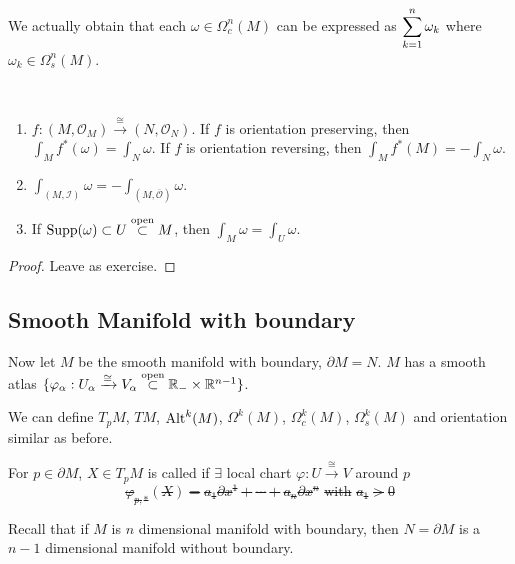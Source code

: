 \begin{remark}
    We actually obtain that each  $ \omega\in \Omega_c^n(M) $ can be expressed as  $ \displaystyle\sum_{k=1}^n\omega_k $ where  $ \omega_k\in\Omega_s^n(M) $.   
\end{remark}
\begin{proposition}
    \,
    \begin{enumerate}
        \item  $ f:(M,\mathcal{O}_M)\xrightarrow{\cong}(N,\mathcal{O}_N) $. If  $ f $ is orientation preserving, then  $ \int_Mf^*(\omega)=\int_N\omega $. If  $ f $ is orientation reversing, then  $ \int_Mf^*(M)=-\int_N\omega $. 
        \item  $ \int_{(M,\mathcal{I})}\omega=-\int_{(M,\overline{\mathcal{O}})}\omega $.
        \item If  $ \mathrm{Supp}(\omega)\subset U\overset{\text{open}}{\subset} M $, then  $ \int_M\omega=\int_U\omega $.       
    \end{enumerate}
\end{proposition}
\begin{proof}
    Leave as exercise.
\end{proof}

\subsection{Smooth Manifold with boundary}
Now let  $ M $ be the smooth manifold with boundary,  $ \partial M=N $. \ie  $ M $ has a smooth atlas  $ \{\varphi_\alpha:U_\alpha\xrightarrow{\cong}V_\alpha\overset{\text{open}}{\subset}\mathbb R_{-}\times\mathbb R^{n-1}\} $.

We can define  $ T_pM $,  $ TM $, $ \mathrm{Alt}^k(M) $, $ \Omega^k(M) $,  $ \Omega_c^k(M) $,  $ \Omega_s^k(M) $ and orientation similar as before.

For  $ p\in\partial M $,  $ X\in T_pM $ is called   if  $ \exists $ local chart  $ \varphi:U\xrightarrow{\cong}V $ around  $ p $ \st 
\[\varphi_{p,*}(X)=a_1\partial x^1+\cdots+a_n\partial x^n\text{ with }a_1>0\]   

Recall that if  $ M $ is  $ n $ dimensional manifold with boundary, then  $ N=\partial M $ is a  $ n-1 $ dimensional manifold without boundary.  

